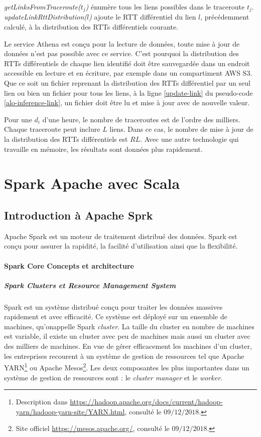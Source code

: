 \textit{getLinksFromTraceroute($t_j$)} énumère tous les liens possibles dans le traceroute $t_j$.
\textit{updateLinkRttDistribution($l$)} ajoute le RTT différentiel du lien $l$, précédemment calculé, à la distribution des RTTs différentiels courante.

Le service Athena est conçu pour la lecture de données, toute mise à jour de données n'est pas possible avec ce service. C'est pourquoi la distribution des RTTs différentiels de chaque  lien identifié doit être sauvegardée dans un endroit accessible en lecture et en écriture, par exemple dans un compartiment AWS S3. Que ce soit un fichier reprenant la distribution des RTTs différentiel  par un seul lien ou bien un fichier pour tous les liens,   à la ligne  \ref{update-link} du pseudo-code \ref{alo-inference-link}, un fichier doit être lu et mise à jour avec de nouvelle valeur.

Pour une $d_i$ d'une heure, le nombre de traceroutes est de l'ordre des milliers. Chaque traceroute peut inclure $L$ liens. Dans ce cas, le nombre de mise à jour de la distribution des RTTs différentiels est $R$\texttimes$L$. Avec une autre technologie qui travaille en mémoire, les résultats sont données plus rapidement. 







\section{Spark Apache avec Scala}

\subsection{Introduction à Apache Sprk}

Apache Spark est un moteur de traitement distribué des données. Spark est conçu pour assurer la rapidité, la facilité d'utilisation ainsi que la flexibilité.

\paragraph{Spark Core Concepts et architecture}

\subparagraph{Spark Clusters et Resource Management System}

Spark est un système distribué conçu pour traiter les données massives rapidement et avec efficacité. Ce système est déployé sur un ensemble de machines, qu'onappelle Spark \textit{cluster}. La taille du cluster en nombre de machines est variable, il existe un cluster avec peu de machines mais aussi un cluster avec des milliers de machines. En vue de gérer efficacement les machines d'un cluster, les entreprises recourent à un système de gestion de ressources tel que Apache YARN\footnote{Description dans \url{https://hadoop.apache.org/docs/current/hadoop-yarn/hadoop-yarn-site/YARN.html}, consulté le $09/12/2018$.} ou Apache Mesos\footnote{Site officiel \url{https://mesos.apache.org/}, consulté le $09/12/2018$.}. Les deux composantes les plus importantes dans un système de gestion de ressources sont : le \textit{cluster manager} et le \textit{worker}.

